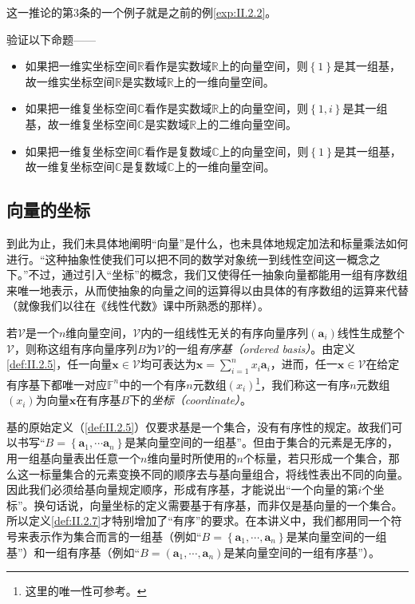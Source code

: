 \documentclass[../main.tex]{subfiles}
\begin{document}
这一推论的第3条的一个例子就是之前的例\ref{exp:II.2.2}。

\begin{example}
    验证以下命题——
    \begin{itemize}
        \item 如果把一维实坐标空间$\mathbb{R}$看作是实数域$\mathbb{R}$上的向量空间，则$\left\{1\right\}$是其一组基，故一维实坐标空间$\mathbb{R}$是实数域$\mathbb{R}$上的一维向量空间。
        \item 如果把一维复坐标空间$\mathbb{C}$看作是实数域$\mathbb{R}$上的向量空间，则$\left\{1,i\right\}$是其一组基，故一维复坐标空间$\mathbb{C}$是实数域$\mathbb{R}$上的二维向量空间。
        \item 如果把一维复坐标空间$\mathbb{C}$看作是复数域$\mathbb{C}$上的向量空间，则$\left\{1\right\}$是其一组基，故一维复坐标空间$\mathbb{C}$是复数域$\mathbb{C}$上的一维向量空间。
    \end{itemize}
\end{example}
\subsection{向量的坐标}\label{sec:II.2.1.3}
到此为止，我们未具体地阐明“向量”是什么，也未具体地规定加法和标量乘法如何进行。“这种抽象性使我们可以把不同的数学对象统一到线性空间这一概念之下。”\cite[p.~167]{周胜林2012线性代数}不过，通过引入“坐标”的概念，我们又使得任一抽象向量都能用一组有序数组来唯一地表示，从而使抽象的向量之间的运算得以由具体的有序数组的运算来代替（就像我们以往在《线性代数》课中所熟悉的那样）。

\begin{definition}[向量在给定有序基下的坐标]\label{def:II.2.7}若$\mathcal{V}$是一个$n$维向量空间，$\mathcal{V}$内的一组线性无关的有序向量序列$\left(\mathbf{a}_i\right)$线性生成整个$\mathcal{V}$，则称这组有序向量序列$B$为$\mathcal{V}$的一组\emph{有序基（ordered basis）}。由定义\ref{def:II.2.5}，任一向量$\mathbf{x}\in\mathcal{V}$均可表达为$\mathbf{x}=\sum_{i=1}^nx_i\mathbf{a}_i$，进而，任一$\mathbf{x}\in\mathcal{V}$在给定有序基下都唯一对应$\mathbb{F}^n$中的一个有序$n$元数组$\left(x_i\right)$\footnote{这里的唯一性可参考\cite[\S 7.2定义2.3下“(3)的证明”]{周胜林2012线性代数}。}，我们称这一有序$n$元数组$\left(x_i\right)$为向量$\mathbf{x}$在有序基$B$下的\emph{坐标（coordinate）}。
\end{definition}

基的原始定义（\ref{def:II.2.5}）仅要求基是一个集合，没有有序性的规定。故我们可以书写“$B=\left\{\mathbf{a}_1,\cdots\mathbf{a}_n\right\}$是某向量空间的一组基”。但由于集合的元素是无序的，用一组基向量表出任意一个$n$维向量时所使用的$n$个标量，若只形成一个集合，那么这一标量集合的元素变换不同的顺序去与基向量组合，将线性表出不同的向量。因此我们必须给基向量规定顺序，形成有序基，才能说出“一个向量的第$i$个坐标”。换句话说，向量坐标的定义需要基于有序基，而非仅是基向量的一个集合。所以定义\ref{def:II.2.7}才特别增加了“有序”的要求。在本讲义中，我们都用同一个符号来表示作为集合而言的一组基（例如“$B=\left\{\mathbf{a}_1,\cdots,\mathbf{a}_n\right\}$是某向量空间的一组基”）和一组有序基（例如“$B=\left(\mathbf{a}_1,\cdots,\mathbf{a}_n\right)$是某向量空间的一组有序基”）。
\end{document}
